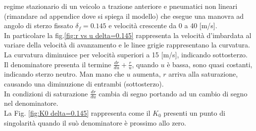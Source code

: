 regime stazionario di un veicolo a trazione anteriore e pneumatici non lineari (rimandare ad appendice dove si spiega il
modello) che esegue una manovra ad angolo di sterzo fissato $\delta_f = 0.145$ e velocità crescente da 0 a 40 [m/s].\\
In particolare la fig.\ref{fig:r vs u delta=0.145} rappresenta la velocità d'imbardata al variare della velocità di avanzamento e le linee grigie rappresentano la curvatura.
La curvatura diminuisce per velocità superiori a 15 [m/s], indicando sottosterzo.\\ 
Il denominatore presenta il termine $\frac{dr}{du} + \frac{r}{u}$, quando $u$ è bassa, sono quasi costanti, indicando
sterzo neutro. Man mano che $u$ aumenta, $r$ arriva alla saturazione, causando una diminuzione di entrambi (sottosterzo).\\
In condizioni di saturazione $\frac{dr}{du}$ cambia di segno portando ad un cambio di segno nel denominatore.\\
La Fig. \ref{fig:K0 delta=0.145} rappresenta come il $K_0$ presenti un punto di singolarità quando il suò denominatore è 
prossimo allo zero.\\ 

